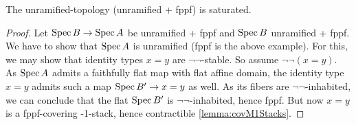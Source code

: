 \begin{example}
	The unramified-topology (unramified + fppf) is saturated.
\end{example}
\begin{proof}
	Let $\operatorname{Spec} B \to \operatorname{Spec} A$ be unramified + fppf and $\operatorname{Spec} B$ unramified + fppf. We have to show that $\operatorname{Spec} A$ is unramified (fppf is the above example). For this, we may show that identity types $x = y$ are $\lnot \lnot$-stable. So assume $\lnot \lnot (x = y).$\\
	As $\operatorname{Spec} A$ admits a faithfully flat map with flat affine domain, the identity type $x = y$ admits such a map $\operatorname{Spec} B' \to x = y$ as well. As its fibers are $\lnot \lnot$-inhabited, we can conclude that the flat $\operatorname{Spec} B'$ is $\lnot \lnot $-inhabited, hence fppf. But now $x = y$ is a fppf-covering -1-stack, hence contractible \ref{lemma:covM1Stacks}.
\end{proof}
%
%
%
%

